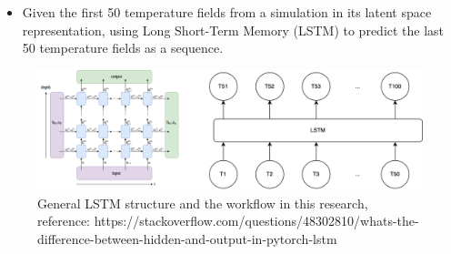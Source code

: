 {\begin{itemize}
    \item Given the first 50 temperature fields from a simulation in its latent space representation, using Long Short-Term Memory (LSTM) to predict the last 50 temperature fields as a sequence.

\end{itemize}

\begin{figure}[H]
    \centering
    \includegraphics[width=0.8\linewidth]{figures/LSTM_workflow.png}
    \caption{General LSTM structure and the workflow in this research, reference: https://stackoverflow.com/questions/48302810/whats-the-difference-between-hidden-and-output-in-pytorch-lstm}
\end{figure}
}

